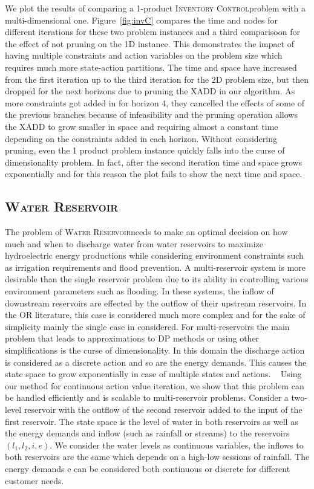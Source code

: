 \documentclass[letterpaper]{article}
\newcommand{\InventoryControl}{\textsc{Inventory Control}}
\newcommand{\WaterReservoir}{\textsc{Water Reservoir}}
\begin{document}
We plot the results of comparing a 1-product \InventoryControl problem with a multi-dimensional one. Figure~\ref{fig:invC} compares the time and nodes for different iterations for these two problem instances and a third comparisoon for the effect of not pruning on the 1D instance. This demonstrates the impact of having multiple constraints and action variables on the problem size which requires much more state-action partitions. The time and space have increased from the first iteration up to the third iteration for the 2D problem size, but then dropped for the next horizons due to pruning the XADD in our algorithm. As more constraints got added in for horizon 4, they cancelled the effects of some of the previous branches because of infeasibility and the pruning operation allows the XADD to grow smaller in space and requiring almost a constant time depending on the constraints added in each horizon. Without considering pruning, even the 1 product problem instance quickly falls into the curse of dimensionality problem. In fact, after the second iteration time and space grows exponentially and for this reason the plot fails to show the next time and space. 



\subsection{\WaterReservoir}The problem of \WaterReservoir  needs to make an optimal decision on how much and when to discharge water from water reservoirs to maximize hydroelectric energy productions while considering environment constraints such as irrigation requirements and flood prevention. 
A multi-reservoir system is more desirable than the single reservoir problem due to its ability in controlling various environment parameters such as flooding.  In these systems, the inflow of downstream reservoirs are effected by the outflow of their upstream reservoirs. In the OR literature, this case  is considered much more complex and for the sake of simplicity mainly the single case in considered. For multi-reservoirs the main problem that leads to approximations to DP methods or using other simplifications is the curse of dimensionality. In this domain the discharge action is considered as a discrete action  and so are the energy demands. This causes the state space to grow exponentially in case of multiple states and actions. ~\cite{reservoir}
Using our method for continuous action value iteration, we show that this problem can be handled efficiently and is scalable to multi-reservoir problems. Consider a two-level reservoir with the outflow of the second reservoir added to the input of the first reservoir. The state space is the level of water in both reservoirs as well as the energy demands and inflow (such as rainfall or streams) to the reservoirs $(l_1,l_2,i,e)$. We consider the water levels as continuous variables, the inflows to both reservoirs are the same which depends on a high-low sessions of rainfall. The energy demands e can be considered both continuous or discrete for different customer needs. 
\end{document}
